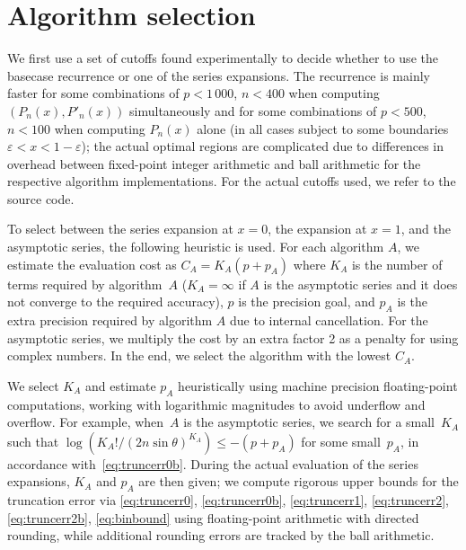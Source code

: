 \documentclass[nohypdvips,review]{siamart0216}
\begin{document}
\section{Algorithm selection}

\label{sec:selection}

We first use a set of cutoffs found experimentally to decide whether to use the basecase recurrence or one of the series expansions. The recurrence is mainly faster for some combinations of $p < 1\,000$, $n < 400$ when computing $(P_n(x), P'_n(x))$ simultaneously and for some combinations of $p < 500$, $n < 100$ when computing $P_n(x)$ alone (in all cases subject to some boundaries $\varepsilon < x < 1 - \varepsilon$); the actual optimal regions are complicated due to differences in overhead between fixed-point integer arithmetic and ball arithmetic for the respective algorithm implementations. For the actual cutoffs used, we refer to the source code.

To select between the series expansion at $x = 0$, the expansion at $x = 1$, and the asymptotic series, the following heuristic is used. For each algorithm $A$, we estimate the evaluation cost as $C_A = K_A (p + p_A)$ where $K_A$ is the number of terms required by algorithm~$A$ ($K_A = \infty$ if $A$ is the asymptotic series and it does not converge to the required accuracy), $p$ is the precision goal, and $p_A$ is the extra precision required by algorithm $A$ due to internal cancellation. For the asymptotic series, we multiply the cost by an extra factor 2 as a penalty for using complex numbers. In the end, we select the algorithm with the lowest $C_A$.

We select $K_A$ and estimate $p_A$ heuristically using machine precision
floating-point computations, working with logarithmic magnitudes to
avoid underflow and overflow.
For example, when~$A$ is the asymptotic series, we search for a
small~$K_A$ such that $\log(K_A!/(2n\sin\theta)^{K_A}) \leq -(p + p_A)$
for some small~$p_A$, in accordance with~\cref{eq:truncerr0b}.
During the actual evaluation of the series expansions, $K_A$ and $p_A$ are then given;
we compute rigorous upper bounds
for the truncation error via
\cref{eq:truncerr0}, \cref{eq:truncerr0b}, \cref{eq:truncerr1},
\cref{eq:truncerr2}, \cref{eq:truncerr2b}, \cref{eq:binbound}
using floating-point arithmetic with directed rounding,
while additional rounding errors are tracked by the ball arithmetic.
\end{document}
